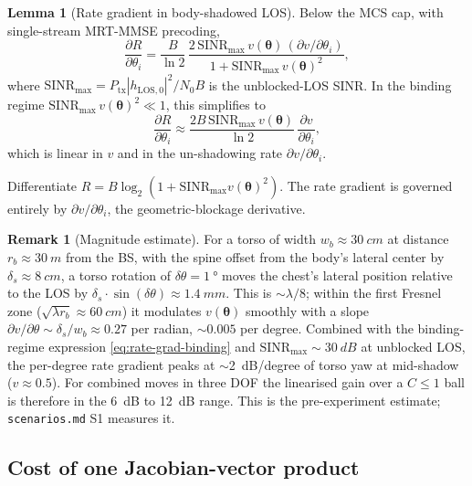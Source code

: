 \documentclass[11pt,a4paper]{article}
\theoremstyle{definition}
\newtheorem{lemma}[lemma]{Lemma}
\newtheorem{remark}[remark]{Remark}
\newcommand{\thetab}{\bm{\theta}}
\newcommand{\SINR}{\mathrm{SINR}}
\begin{document}
\begin{lemma}[Rate gradient in body-shadowed LOS]\label{lem:rate-grad}
Below the MCS cap, with single-stream MRT-MMSE precoding,
\begin{equation}\label{eq:rate-grad-los}
  \frac{\partial R}{\partial\theta_i}
  =\frac{B}{\ln 2}\,
    \frac{2\,\SINR_{\max}\,v(\thetab)\,(\partial v/\partial\theta_i)}
         {1+\SINR_{\max}\,v(\thetab)^2},
\end{equation}
where $\SINR_{\max}=P_{\mathrm{tx}}|h_{\mathrm{LOS},0}|^2/N_0B$ is
the unblocked-LOS SINR.  In the binding regime
$\SINR_{\max}\,v(\thetab)^2\ll 1$, this simplifies to
\begin{equation}\label{eq:rate-grad-binding}
  \frac{\partial R}{\partial\theta_i}\approx
  \frac{2B\,\SINR_{\max}\,v(\thetab)}{\ln 2}\,
        \frac{\partial v}{\partial\theta_i},
\end{equation}
which is linear in $v$ and in the un-shadowing rate
$\partial v/\partial\theta_i$.
\end{lemma}

\noindent Differentiate
$R=B\log_2(1+\SINR_{\max}v(\thetab)^2)$.  The rate gradient is
governed entirely by $\partial v/\partial\theta_i$, the
geometric-blockage derivative.

\begin{remark}[Magnitude estimate]\label{rem:dB-per-deg}
For a torso of width $w_b\approx\SI{30}{cm}$ at distance $r_b
\approx\SI{30}{m}$ from the BS, with the spine offset from the
body's lateral center by $\delta_s\approx\SI{8}{cm}$, a torso
rotation of $\delta\theta=\SI{1}{\degree}$ moves the chest's
lateral position relative to the LOS by $\delta_s\cdot\sin
(\delta\theta)\approx\SI{1.4}{mm}$.  This is $\sim$$\lambda/8$;
within the first Fresnel zone ($\sqrt{\lambda r_b}\approx
\SI{60}{cm}$) it modulates $v(\thetab)$ smoothly with a slope
$\partial v/\partial\theta\sim\delta_s/w_b\approx 0.27$ per radian,
$\sim 0.005$ per degree.  Combined with the binding-regime
expression \eqref{eq:rate-grad-binding} and $\SINR_{\max}\sim
\SI{30}{dB}$ at unblocked LOS, the per-degree rate gradient
peaks at $\sim$\SI{2}{dB/degree} of torso yaw at mid-shadow
($v\approx 0.5$).  For combined moves in three DOF the linearised
gain over a $C\le 1$ ball is therefore in the \SI{6}{dB} to
\SI{12}{dB} range.  This is the pre-experiment estimate;
\texttt{scenarios.md} S1 measures it.
\end{remark}

\subsection{Cost of one Jacobian-vector product}
\end{document}

